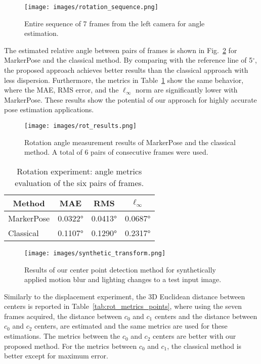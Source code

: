 \documentclass[final]{cvpr}
\begin{document}
\begin{figure}[h]
    \centering
    \texttt{[image: images/rotation\_sequence.png]}
    \caption{Entire sequence of 7 frames from the left camera for angle estimation.}
    \label{fig:rotation_sequece}
\end{figure}

The estimated relative angle between pairs of frames is shown in Fig.~\ref{fig:rot_results} for MarkerPose and the classical method. By comparing with the reference line of 5$^\circ$, the proposed approach achieves better results than the classical approach with less dispersion. Furthermore, the metrics in Table~\ref{tab:rot_metrics} show the same behavior, where the MAE, RMS error, and the $\ell_\infty$ norm are significantly lower with MarkerPose. These results show the potential of our approach for highly accurate pose estimation applications.

\begin{figure}[h]
    \centering
    \texttt{[image: images/rot\_results.png]}
    \caption{Rotation angle measurement results of MarkerPose and the classical method. A total of 6 pairs of consecutive frames were used.}
    \label{fig:rot_results}
\end{figure}


\begin{table}[h]
\centering
\begin{tabular}{lccc}
\multicolumn{1}{c}{\textbf{Method}} & \textbf{MAE} & \textbf{RMS} & $\mathbf{\ell_\infty}$ \\ \hline
MarkerPose                            & 0.0322°      & 0.0413°      & 0.0687°                \\
Classical                           & 0.1107°      & 0.1290°      & 0.2317°                \\ \hline
\end{tabular}
\caption{Rotation experiment: angle metrics evaluation of the six pairs of frames.}
\label{tab:rot_metrics}
\end{table}

\begin{figure*}
    \centering
    \texttt{[image: images/synthetic\_transform.png]}
    \caption{Results of our center point detection method for synthetically applied motion blur and lighting changes to a test input image.}
    \label{fig:synthetic_transform}
\end{figure*}


Similarly to the displacement experiment, the 3D Euclidean distance between centers is reported in Table~\ref{tab:rot_metrics_points}, where using the seven frames acquired, the distance between $c_0$ and $c_1$ centers and the distance between $c_0$ and $c_2$ centers, are estimated and the same metrics are used for these estimations. The metrics between the $c_0$ and $c_2$ centers are better with our proposed method. For the metrics between $c_0$ and $c_1$, the classical method is better except for maximum error.
\end{document}
